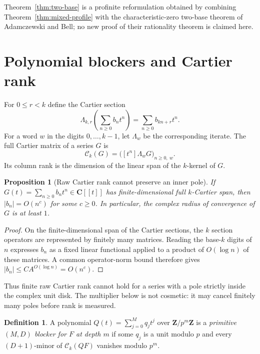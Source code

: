 \documentclass[11pt,reqno]{amsart}
\newtheorem{proposition}[theorem]{Proposition}
\theoremstyle{definition}
\newtheorem{definition}[theorem]{Definition}
\theoremstyle{remark}
\newcommand{\Z}{\mathbf Z}
\newcommand{\C}{\mathbf C}
\begin{document}
Theorem~\ref{thm:two-base} is a profinite reformulation obtained by
combining Theorem~\ref{thm:mixed-profile} with the characteristic-zero
two-base theorem of Adamczewski and Bell; no new proof of their rationality
theorem is claimed here.

\section{Polynomial blockers and Cartier rank}

For $0\leq r<k$ define the Cartier section
\[
 \Lambda_{k,r}\!\left(\sum_{n\geq0}b_nt^n\right)
   =\sum_{n\geq0}b_{kn+r}t^n.
\]
For a word $w$ in the digits $0,\ldots,k-1$, let $\Lambda_w$ be the
corresponding iterate.  The full Cartier matrix of a series $G$ is
\begin{equation}\label{eq:cartier-matrix}
 \mathcal C_k(G)=\bigl([t^n]\Lambda_wG\bigr)_{n\geq0,\ w}.
\end{equation}
Its column rank is the dimension of the linear span of the $k$-kernel of
$G$.

\begin{proposition}[Raw Cartier rank cannot preserve an inner pole]
\label{prop:raw-radius}
If $G(t)=\sum_{n\geq0}b_nt^n\in\C[[t]]$ has finite-dimensional full
$k$-Cartier span, then $|b_n|=O(n^c)$ for some $c\geq0$.  In particular,
the complex radius of convergence of $G$ is at least $1$.
\end{proposition}

\begin{proof}
On the finite-dimensional span of the Cartier sections, the $k$ section
operators are represented by finitely many matrices.  Reading the base-$k$
digits of $n$ expresses $b_n$ as a fixed linear functional applied to a
product of $O(\log n)$ of these matrices.  A common operator-norm bound
therefore gives $|b_n|\leq C A^{O(\log n)}=O(n^c)$.
\end{proof}

Thus finite raw Cartier rank cannot hold for a series with a pole strictly
inside the complex unit disk.  The multiplier below is not cosmetic: it may
cancel finitely many poles before rank is measured.

\begin{definition}
A polynomial $Q(t)=\sum_{j=0}^{M}q_jt^j$ over $\Z/p^m\Z$ is a
\emph{primitive $(M,D)$ blocker for $F$ at depth $m$} if some $q_j$ is a
unit modulo $p$ and every $(D+1)$-minor of
$\mathcal C_k(QF)$ vanishes modulo $p^m$.
\end{definition}
\end{document}
